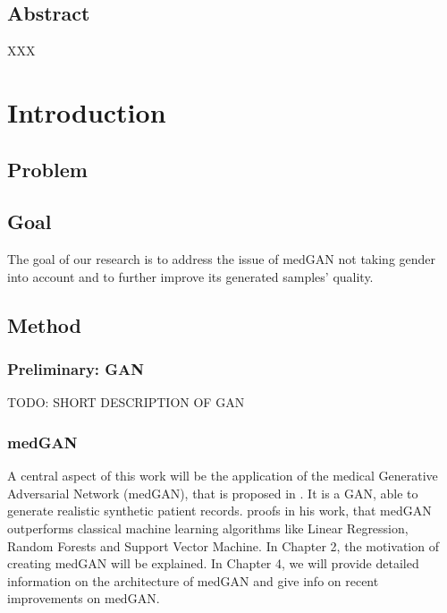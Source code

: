 \documentclass[11pt, a4paper]{book}
\def\blankpage{%
      \clearpage%
      \thispagestyle{empty}%
      \addtocounter{page}{-1}%
      \null%
      \clearpage}
\begin{document}
\pagestyle{fancy}
\thispagestyle{empty}
\renewcommand{\bibname}{References}

\renewcommand\theadfont{\normalsize}

\thispagestyle{empty}
\maketitle

\blankpage

\thispagestyle{empty}
\section*{Abstract}
XXX


\blankpage

\clearpage

\thispagestyle{empty}
\tableofcontents

\blankpage







\chapter{Introduction}

\section{Problem}
\section{Goal}
The goal of our research is to address the issue of medGAN not taking gender into account and to further improve its generated samples' quality.
\section{Method}
\subsection{Preliminary: GAN}
TODO: SHORT DESCRIPTION OF GAN
\subsection{medGAN}
A central aspect of this work will be the application of the medical Generative Adversarial Network (medGAN), that is proposed in \cite{Choi2017}.
It is a GAN, able to generate realistic synthetic patient records. \cite{Choi2017} proofs in his work, that medGAN outperforms classical machine learning algorithms like Linear Regression, Random Forests and Support Vector Machine. 
In Chapter 2, the motivation of creating medGAN will be explained. In Chapter 4, we will provide detailed information on the architecture of medGAN and give info on recent improvements on medGAN.
\end{document}
